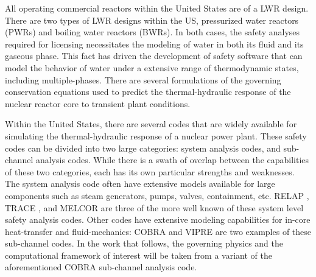 All operating commercial reactors within the United States are of a LWR design.
There are two types of LWR designs within the US, pressurized water reactors (PWRs) and boiling water reactors (BWRs).
In both cases, the safety analyses required for licensing necessitates the modeling of water in both its fluid and its gaseous phase.
This fact has driven the development of safety software that can model the behavior of water under a extensive range of thermodynamic states, including multiple-phases.
There are several formulations of the governing conservation equations used to predict the thermal-hydraulic response of the nuclear reactor core to transient plant conditions.

Within the United States, there are several codes that are widely available for simulating the thermal-hydraulic response of a nuclear power plant.
These safety codes can be divided into two large categories: system analysis codes, and sub-channel analysis codes.
While there is a swath of overlap between the capabilities of these two categories, each has its own particular strengths and weaknesses.
The system analysis code often have extensive models available for large components such as steam generators, pumps, valves, containment, etc.
RELAP \cite{RELAP}, TRACE \cite{TRACE}, and MELCOR \cite{Summers1994} are three of the more well known of these system level safety analysis codes.
Other codes have extensive modeling capabilities for in-core heat-transfer and fluid-mechanics: COBRA \cite{Thurgood1983c} and VIPRE are two examples of these sub-channel codes.
In the work that follows, the governing physics and the computational framework of interest will be taken from a variant of the aforementioned COBRA sub-channel analysis code.
